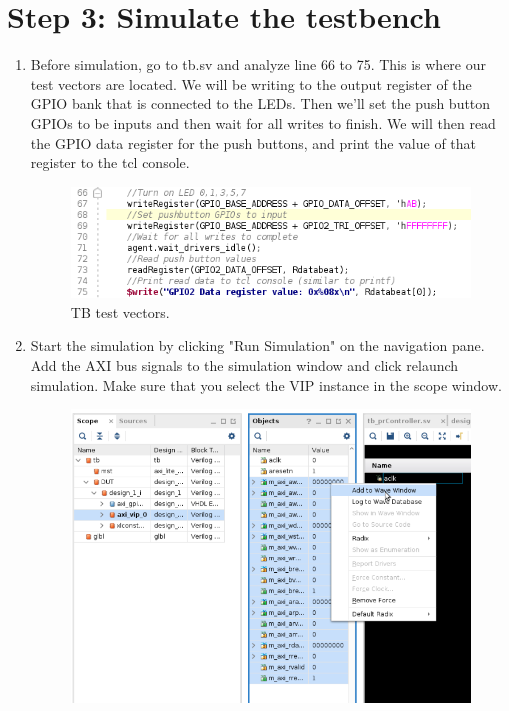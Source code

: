 \documentclass[12pt]{article}
\begin{document}
\section*{Step 3: Simulate the testbench}
\begin{enumerate}
	\item Before simulation, go to tb.sv and analyze line 66 to 75. This is where our test vectors are located. We will be writing to the output register of the GPIO bank that is connected to the LEDs. Then we'll set the push button GPIOs to be inputs and then wait for all writes to finish. We will then read the GPIO data register for the push buttons, and print the value of that register to the tcl console.
		\begin{figure}[H]
		  \centering
		  \includegraphics[scale=0.5]{tbanalysis.png}
		  \caption{TB test vectors.}
		  \label{fig:tbanalysis}
		\end{figure} 
	\item  Start the simulation by clicking "Run Simulation" on the navigation pane. Add the AXI bus signals to the simulation window and click relaunch simulation. Make sure that you select the VIP instance in the scope window.
		\begin{figure}[H]
		  \centering
		  \includegraphics[scale=0.5]{addtbsignals.png}

\end{figure}
\end{enumerate}
\end{document}
